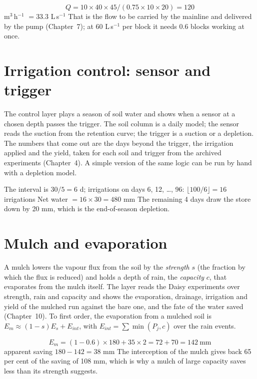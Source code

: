 \sol {}\ans \[Q=10\times40\times45/(0.75\times10\times20)=120\] m$^3$\,h$^{-1}$ $=33.3$ L\,s$^{-1}$ \ans That is the flow to be carried by the mainline and delivered by the pump (Chapter~7); at 60 L\,s$^{-1}$ per block it needs 0.6 blocks working at once. \finans

\section{Irrigation control: sensor and trigger}
The control layer plays a season of soil water and shows when a sensor at a chosen depth passes the trigger. The soil column is a daily model; the sensor reads the suction from the retention curve; the trigger is a suction or a depletion. The numbers that come out are the days beyond the trigger, the irrigation applied and the yield, taken for each soil and trigger from the archived experiments (Chapter~4). A simple version of the same logic can be run by hand with a depletion model.

\sol The interval is $30/5=6$ d; irrigations on days 6, 12, \dots, 96: $\lfloor100/6\rfloor=16$ irrigations \ans Net water $=16\times30=480$ mm \ans The remaining 4 days draw the store down by 20 mm, which is the end-of-season depletion. \finans

\section{Mulch and evaporation}
A mulch lowers the vapour flux from the soil by the \emph{strength} $s$ (the fraction by which the flux is reduced) and holds a depth of rain, the \emph{capacity} $c$, that evaporates from the mulch itself. The layer reads the Daisy experiments over strength, rain and capacity and shows the evaporation, drainage, irrigation and yield of the mulched run against the bare one, and the fate of the water saved (Chapter~10). To first order, the evaporation from a mulched soil is $E_m\approx(1-s)E_s+E_{int}$, with $E_{int}=\sum\min(P_j,c)$ over the rain events.

\sol \[E_m=(1-0.6)\times180+35\times2=72+70=142\ \text{mm}\]
apparent saving $180-142=38$ mm \ans The interception of the mulch gives back 65 per cent of the saving of 108 mm, which is why a mulch of large capacity saves less than its strength suggests. \finans

